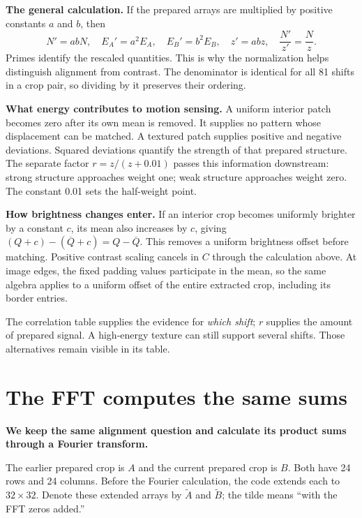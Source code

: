 \documentclass[11pt,letterpaper]{article}
\begin{document}
\textbf{The general calculation.} If the prepared arrays are multiplied by positive constants $a$ and $b$, then
\[
N'=abN,\quad E_A'=a^2E_A,\quad E_B'=b^2E_B,
\quad z'=abz,\quad \frac{N'}{z'}=\frac{N}{z}.
\]
Primes identify the rescaled quantities. This is why the normalization helps distinguish alignment from contrast. The denominator is identical for all 81 shifts in a crop pair, so dividing by it preserves their ordering.

\textbf{What energy contributes to motion sensing.} A uniform interior patch becomes zero after its own mean is removed. It supplies no pattern whose displacement can be matched. A textured patch supplies positive and negative deviations. Squared deviations quantify the strength of that prepared structure. The separate factor $r=z/(z+0.01)$ passes this information downstream: strong structure approaches weight one; weak structure approaches weight zero. The constant 0.01 sets the half-weight point.

\textbf{How brightness changes enter.} If an interior crop becomes uniformly brighter by a constant $c$, its mean also increases by $c$, giving $(Q+c)-(\overline Q+c)=Q-\overline Q$. This removes a uniform brightness offset before matching. Positive contrast scaling cancels in $C$ through the calculation above. At image edges, the fixed padding values participate in the mean, so the same algebra applies to a uniform offset of the entire extracted crop, including its border entries.

The correlation table supplies the evidence for \emph{which shift}; $r$ supplies the amount of prepared signal. A high-energy texture can still support several shifts. Those alternatives remain visible in its table.

\clearpage

\section{The FFT computes the same sums}\label{sec6}
\textbf{We keep the same alignment question and calculate its product sums through a Fourier transform.}

The earlier prepared crop is $A$ and the current prepared crop is $B$. Both have 24 rows and 24 columns. Before the Fourier calculation, the code extends each to $32\times32$. Denote these extended arrays by $\widetilde A$ and $\widetilde B$; the tilde means ``with the FFT zeros added.''
\end{document}
